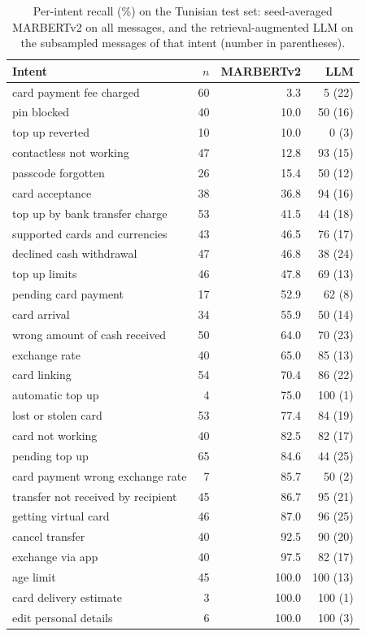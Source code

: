 \begin{table}[t]\centering\small\caption{Per-intent recall (\%) on the Tunisian test set: seed-averaged MARBERTv2 on all messages, and the retrieval-augmented LLM on the subsampled messages of that intent (number in parentheses).}\label{tab:tunintents}
\begin{tabular}{lrrr}\toprule
Intent & $n$ & MARBERTv2 & LLM \\\midrule
card payment fee charged & 60 & 3.3 & 5 (22) \\
pin blocked & 40 & 10.0 & 50 (16) \\
top up reverted & 10 & 10.0 & 0 (3) \\
contactless not working & 47 & 12.8 & 93 (15) \\
passcode forgotten & 26 & 15.4 & 50 (12) \\
card acceptance & 38 & 36.8 & 94 (16) \\
top up by bank transfer charge & 53 & 41.5 & 44 (18) \\
supported cards and currencies & 43 & 46.5 & 76 (17) \\
declined cash withdrawal & 47 & 46.8 & 38 (24) \\
top up limits & 46 & 47.8 & 69 (13) \\
pending card payment & 17 & 52.9 & 62 (8) \\
card arrival & 34 & 55.9 & 50 (14) \\
wrong amount of cash received & 50 & 64.0 & 70 (23) \\
exchange rate & 40 & 65.0 & 85 (13) \\
card linking & 54 & 70.4 & 86 (22) \\
automatic top up & 4 & 75.0 & 100 (1) \\
lost or stolen card & 53 & 77.4 & 84 (19) \\
card not working & 40 & 82.5 & 82 (17) \\
pending top up & 65 & 84.6 & 44 (25) \\
card payment wrong exchange rate & 7 & 85.7 & 50 (2) \\
transfer not received by recipient & 45 & 86.7 & 95 (21) \\
getting virtual card & 46 & 87.0 & 96 (25) \\
cancel transfer & 40 & 92.5 & 90 (20) \\
exchange via app & 40 & 97.5 & 82 (17) \\
age limit & 45 & 100.0 & 100 (13) \\
card delivery estimate & 3 & 100.0 & 100 (1) \\
edit personal details & 6 & 100.0 & 100 (3) \\
\bottomrule\end{tabular}\end{table}
